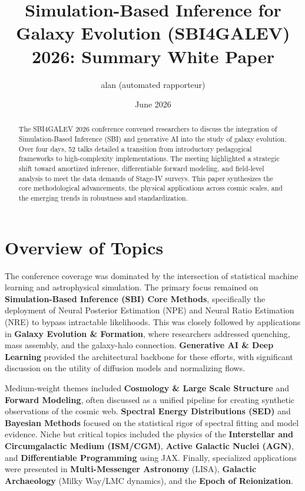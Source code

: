 \documentclass[11pt]{article}
\title{Simulation-Based Inference for Galaxy Evolution (SBI4GALEV) 2026: Summary White Paper}
\author{alan (automated rapporteur)}
\date{June 2026}
\begin{document}
\maketitle

\begin{abstract}
The SBI4GALEV 2026 conference convened researchers to discuss the integration of Simulation-Based Inference (SBI) and generative AI into the study of galaxy evolution. Over four days, 52 talks detailed a transition from introductory pedagogical frameworks to high-complexity implementations. The meeting highlighted a strategic shift toward amortized inference, differentiable forward modeling, and field-level analysis to meet the data demands of Stage-IV surveys. This paper synthesizes the core methodological advancements, the physical applications across cosmic scales, and the emerging trends in robustness and standardization.
\end{abstract}

\section{Overview of Topics}
The conference coverage was dominated by the intersection of statistical machine learning and astrophysical simulation. The primary focus remained on \textbf{Simulation-Based Inference (SBI) Core Methods}, specifically the deployment of Neural Posterior Estimation (NPE) and Neural Ratio Estimation (NRE) to bypass intractable likelihoods. This was closely followed by applications in \textbf{Galaxy Evolution \& Formation}, where researchers addressed quenching, mass assembly, and the galaxy-halo connection. \textbf{Generative AI \& Deep Learning} provided the architectural backbone for these efforts, with significant discussion on the utility of diffusion models and normalizing flows.

Medium-weight themes included \textbf{Cosmology \& Large Scale Structure} and \textbf{Forward Modeling}, often discussed as a unified pipeline for creating synthetic observations of the cosmic web. \textbf{Spectral Energy Distributions (SED)} and \textbf{Bayesian Methods} focused on the statistical rigor of spectral fitting and model evidence. Niche but critical topics included the physics of the \textbf{Interstellar and Circumgalactic Medium (ISM/CGM)}, \textbf{Active Galactic Nuclei (AGN)}, and \textbf{Differentiable Programming} using JAX. Finally, specialized applications were presented in \textbf{Multi-Messenger Astronomy} (LISA), \textbf{Galactic Archaeology} (Milky Way/LMC dynamics), and the \textbf{Epoch of Reionization}.
\end{document}
